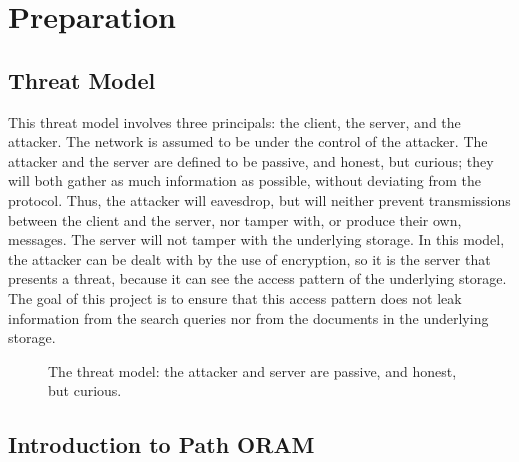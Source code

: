 \documentclass[12pt,a4paper,twoside,openright]{report}
\begin{document}
\chapter{Preparation}

\section{Threat Model}
\label{sec:threatmodel}

This threat model involves three principals: the client, the server, and the attacker. The network is assumed to be under the control of the attacker. The attacker and the server are defined to be passive, and honest, but curious; they will both gather as much information as possible, without deviating from the protocol. Thus, the attacker will eavesdrop, but will neither prevent transmissions between the client and the server, nor tamper with, or produce their own, messages. The server will not tamper with the underlying storage. In this model, the attacker can be dealt with by the use of encryption, so it is the server that presents a threat, because it can see the access pattern of the underlying storage. The goal of this project is to ensure that this access pattern does not leak information from the search queries nor from the documents in the underlying storage.

%

\begin{figure}
    \centering
    \caption{The threat model: the attacker and server are passive, and honest, but curious.}
    \label{fig:threatmodel}
\end{figure}

\section{Introduction to Path ORAM}
\label{sec:oramintro}
\end{document}
